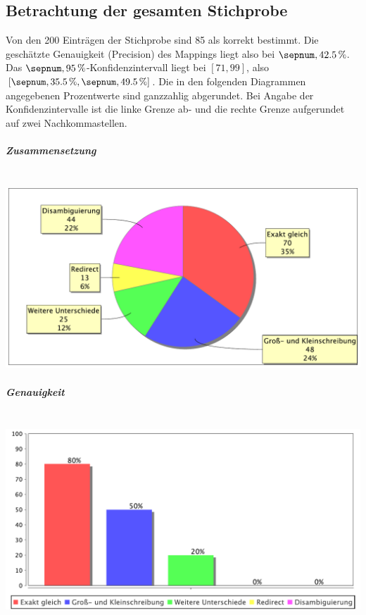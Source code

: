 \fi

\subsection{Betrachtung der gesamten Stichprobe}
Von den 200 Einträgen der Stichprobe sind 85 als korrekt bestimmt. Die geschätzte Genauigkeit (Precision) des Mappings liegt also bei $\valunit{42.5}{\%}$.
Das $\valunit{95}{\%}$-Konfidenzintervall
liegt bei $[71,99]$, also $[\valunit{35.5}{\%},\valunit{49.5}{\%}]$.
Die in den folgenden Diagrammen angegebenen Prozentwerte sind ganzzahlig abgerundet. Bei Angabe der Konfidenzintervalle\footnotemark{} ist die linke Grenze ab- und die rechte Grenze aufgerundet auf zwei Nachkommastellen.
\subparagraph*{Zusammensetzung}~\\
\includegraphics[width=\textwidth]{img/pdf/wortschatz2dbpedia.analyse.GeneralClassifier.piechart.pdf}
\subparagraph*{Genauigkeit}~\\
\includegraphics[width=\textwidth]{img/pdf/wortschatz2dbpedia.analyse.GeneralClassifier.barchart.pdf}

